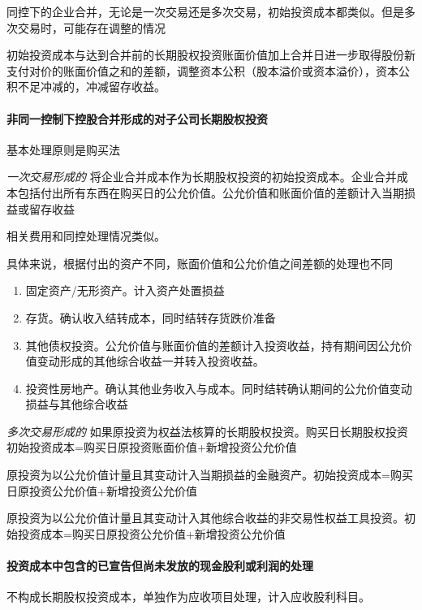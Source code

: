 \documentclass[UTF8,12pt]{ctexart}
\numberwithin{equation}{section} %
\numberwithin{figure}{section}
\numberwithin{table}{section}
\begin{document}
	同控下的企业合并，无论是一次交易还是多次交易，初始投资成本都类似。但是多次交易时，可能存在调整的情况
	
	初始投资成本与达到合并前的长期股权投资账面价值加上合并日进一步取得股份新支付对价的账面价值之和的差额，调整资本公积（股本溢价或资本溢价），资本公积不足冲减的，冲减留存收益。
	
	
	
	\paragraph{非同一控制下控股合并形成的对子公司长期股权投资}
	
	基本处理原则是购买法
	
	\textit{一次交易形成的}
	将企业合并成本作为长期股权投资的初始投资成本。企业合并成本包括付出所有东西在购买日的公允价值。公允价值和账面价值的差额计入当期损益或留存收益
	
	相关费用和同控处理情况类似。
	
	具体来说，根据付出的资产不同，账面价值和公允价值之间差额的处理也不同
	\begin{enumerate}
		\item 固定资产/无形资产。计入资产处置损益
		
		\item 存货。确认收入结转成本，同时结转存货跌价准备
		
		\item 其他债权投资。公允价值与账面价值的差额计入投资收益，持有期间因公允价值变动形成的其他综合收益一并转入投资收益。
		
		\item 投资性房地产。确认其他业务收入与成本。同时结转确认期间的公允价值变动损益与其他综合收益
	\end{enumerate}
	
	\textit{多次交易形成的}
	如果原投资为权益法核算的长期股权投资。购买日长期股权投资初始投资成本=购买日原投资账面价值+新增投资公允价值
	
	原投资为以公允价值计量且其变动计入当期损益的金融资产。初始投资成本=购买日原投资公允价值+新增投资公允价值
	
	原投资为以公允价值计量且其变动计入其他综合收益的非交易性权益工具投资。初始投资成本=购买日原投资公允价值+新增投资公允价值
	
	
	\paragraph{投资成本中包含的已宣告但尚未发放的现金股利或利润的处理}
	不构成长期股权投资成本，单独作为应收项目处理，计入应收股利科目。
	
\end{document}
